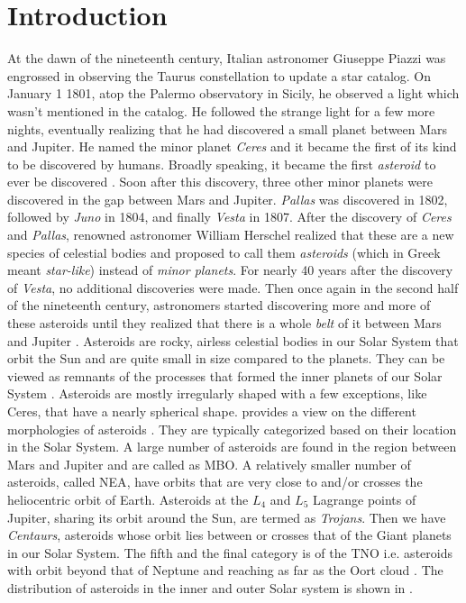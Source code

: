 \chapter{Introduction}
\label{chap:intro}
\graphicspath{{Introduction/Images/}}

At the dawn of the nineteenth century, Italian astronomer Giuseppe Piazzi was engrossed in observing the Taurus constellation to update a star catalog. On January 1 1801, atop the Palermo observatory in Sicily, he observed a light which wasn't mentioned in the catalog. He followed the strange light for a few more nights, eventually realizing that he had discovered a small planet between Mars and Jupiter. He named the minor planet \textit{Ceres} and it became the first of its kind to be discovered by humans. Broadly speaking, it became the first \textit{asteroid} to ever be discovered \parencite{cunningham2016discovery}. Soon after this discovery, three other minor planets were discovered in the gap between Mars and Jupiter. \textit{Pallas} was discovered in 1802, followed by \textit{Juno} in 1804, and finally \textit{Vesta} in 1807. After the discovery of \textit{Ceres} and \textit{Pallas}, renowned astronomer William Herschel realized that these are a new species of celestial bodies and proposed to call them \textit{asteroids} (which in Greek meant \textit{star-like}) instead of \textit{minor planets}. For nearly 40 years after the discovery of \textit{Vesta}, no additional discoveries were made. Then once again in the second half of the nineteenth century, astronomers started discovering more and more of these asteroids until they realized that there is a whole \textit{belt} of it between Mars and Jupiter \parencite{bottke2002asteroids}.
%
\newline\newline
%
Asteroids are rocky, airless celestial bodies in our Solar System that orbit the Sun and are quite small in size compared to the planets. They can be viewed as remnants of the processes that formed the inner planets of our Solar System \parencite{nasa_asteroids_web}. Asteroids are mostly irregularly shaped with a few exceptions, like Ceres, that have a nearly spherical shape.  provides a view on the different morphologies of asteroids \parencite{nasa_asteroids_web}. They are typically categorized based on their location in the Solar System. A large number of asteroids are found in the region between Mars and Jupiter and are called as \gls{MBO}. A relatively smaller number of asteroids, called \gls{NEA}, have orbits that are very close to and/or crosses the heliocentric orbit of Earth. Asteroids at the $L_4$ and $L_5$ Lagrange points of Jupiter, sharing its orbit around the Sun, are termed as \textit{Trojans}. Then we have \textit{Centaurs}, asteroids whose orbit lies between or crosses that of the Giant planets in our Solar System. The fifth and the final category is of the \gls{TNO} i.e. asteroids with orbit beyond that of Neptune and reaching as far as the Oort cloud \parencite{planetarySciencePater}. The distribution of asteroids in the inner and outer Solar system is shown in .
